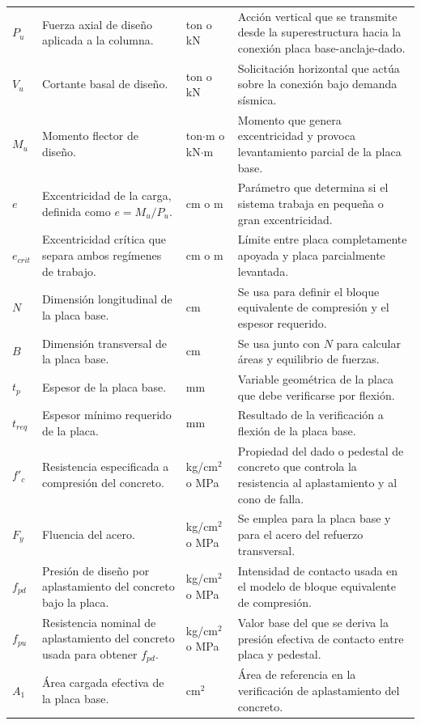 \begin{longtable}{p{} p{} p{} p{}}
$P_u$ & Fuerza axial de diseño aplicada a la columna. & ton o kN & Acción vertical que se transmite desde la superestructura hacia la conexión placa base-anclaje-dado. \\
$V_u$ & Cortante basal de diseño. & ton o kN & Solicitación horizontal que actúa sobre la conexión bajo demanda sísmica. \\
$M_u$ & Momento flector de diseño. & ton$\cdot$m o kN$\cdot$m & Momento que genera excentricidad y provoca levantamiento parcial de la placa base. \\
$e$ & Excentricidad de la carga, definida como $e=M_u/P_u$. & cm o m & Parámetro que determina si el sistema trabaja en pequeña o gran excentricidad. \\
$e_{crit}$ & Excentricidad crítica que separa ambos regímenes de trabajo. & cm o m & Límite entre placa completamente apoyada y placa parcialmente levantada. \\
$N$ & Dimensión longitudinal de la placa base. & cm & Se usa para definir el bloque equivalente de compresión y el espesor requerido. \\
$B$ & Dimensión transversal de la placa base. & cm & Se usa junto con $N$ para calcular áreas y equilibrio de fuerzas. \\
$t_p$ & Espesor de la placa base. & mm & Variable geométrica de la placa que debe verificarse por flexión. \\
$t_{req}$ & Espesor mínimo requerido de la placa. & mm & Resultado de la verificación a flexión de la placa base. \\
$f'_c$ & Resistencia especificada a compresión del concreto. & kg/cm$^2$ o MPa & Propiedad del dado o pedestal de concreto que controla la resistencia al aplastamiento y al cono de falla. \\
$F_y$ & Fluencia del acero. & kg/cm$^2$ o MPa & Se emplea para la placa base y para el acero del refuerzo transversal. \\
$f_{pd}$ & Presión de diseño por aplastamiento del concreto bajo la placa. & kg/cm$^2$ o MPa & Intensidad de contacto usada en el modelo de bloque equivalente de compresión. \\
$f_{pu}$ & Resistencia nominal de aplastamiento del concreto usada para obtener $f_{pd}$. & kg/cm$^2$ o MPa & Valor base del que se deriva la presión efectiva de contacto entre placa y pedestal. \\
$A_1$ & Área cargada efectiva de la placa base. & cm$^2$ & Área de referencia en la verificación de aplastamiento del concreto. \\

\end{longtable}
